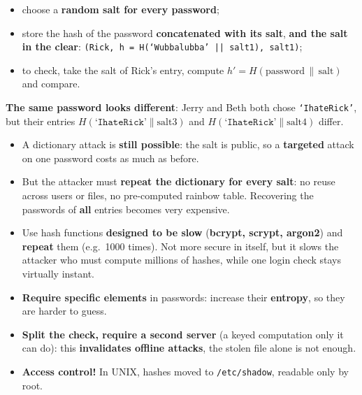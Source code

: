 \begin{defnbox}[title={Option 3: hash + salt --- do this (with a library)}]
\begin{itemize}
  \item choose a \textbf{random salt for every password};
  \item store the hash of the password \textbf{concatenated with its salt}, \textbf{and the salt in
        the clear}: \texttt{(Rick, h = H(`Wubbalubba' || salt1), salt1)};
  \item to check, take the salt of Rick's entry, compute $h' = H(\text{password} \,\|\,
        \text{salt})$ and compare.
\end{itemize}
\textbf{The same password looks different}: Jerry and Beth both chose \texttt{`IhateRick'}, but
their entries $H(\texttt{`IhateRick'}\|\text{salt3})$ and $H(\texttt{`IhateRick'}\|\text{salt4})$
differ.
\end{defnbox}

\begin{propbox}[title=What the salt does and does not buy]
\begin{itemize}
  \item A dictionary attack is \textbf{still possible}: the salt is public, so a
        \textbf{targeted} attack on one password costs as much as before.
  \item But the attacker must \textbf{repeat the dictionary for every salt}: no reuse across
        users or files, no pre-computed rainbow table. Recovering the passwords of \textbf{all}
        entries becomes very expensive.
\end{itemize}
\end{propbox}

\begin{propbox}[title=Complementary defenses]
\begin{itemize}
  \item Use hash functions \textbf{designed to be slow} (\textbf{bcrypt, scrypt, argon2}) and
        \textbf{repeat} them (e.g.\ 1000 times). Not more secure in itself, but it slows the
        attacker who must compute millions of hashes, while one login check stays virtually
        instant.
  \item \textbf{Require specific elements} in passwords: increase their \textbf{entropy}, so
        they are harder to guess.
  \item \textbf{Split the check, require a second server} (a keyed computation only it can do):
        this \textbf{invalidates offline attacks}, the stolen file alone is not enough.
  \item \textbf{Access control!} In UNIX, hashes moved to \texttt{/etc/shadow}, readable only by
        root.
\end{itemize}
\end{propbox}

